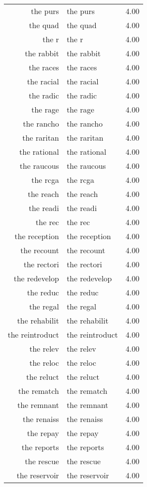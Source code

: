 \begin{table}[ht]
\begin{tabular}{rlr}
  the purs & the purs & 4.00 \\ 
  the quad & the quad & 4.00 \\ 
  the r & the r & 4.00 \\ 
  the rabbit & the rabbit & 4.00 \\ 
  the races & the races & 4.00 \\ 
  the racial & the racial & 4.00 \\ 
  the radic & the radic & 4.00 \\ 
  the rage & the rage & 4.00 \\ 
  the rancho & the rancho & 4.00 \\ 
  the raritan & the raritan & 4.00 \\ 
  the rational & the rational & 4.00 \\ 
  the raucous & the raucous & 4.00 \\ 
  the rcga & the rcga & 4.00 \\ 
  the reach & the reach & 4.00 \\ 
  the readi & the readi & 4.00 \\ 
  the rec & the rec & 4.00 \\ 
  the reception & the reception & 4.00 \\ 
  the recount & the recount & 4.00 \\ 
  the rectori & the rectori & 4.00 \\ 
  the redevelop & the redevelop & 4.00 \\ 
  the reduc & the reduc & 4.00 \\ 
  the regal & the regal & 4.00 \\ 
  the rehabilit & the rehabilit & 4.00 \\ 
  the reintroduct & the reintroduct & 4.00 \\ 
  the relev & the relev & 4.00 \\ 
  the reloc & the reloc & 4.00 \\ 
  the reluct & the reluct & 4.00 \\ 
  the rematch & the rematch & 4.00 \\ 
  the remnant & the remnant & 4.00 \\ 
  the renaiss & the renaiss & 4.00 \\ 
  the repay & the repay & 4.00 \\ 
  the reports & the reports & 4.00 \\ 
  the rescue & the rescue & 4.00 \\ 
  the reservoir & the reservoir & 4.00 \\ 

\end{tabular}
\end{table}
